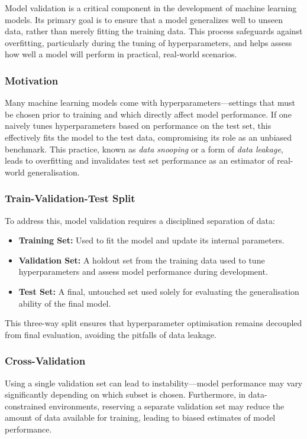 \documentclass[9pt]{extarticle}
\begin{document}
Model validation is a critical component in the development of machine learning models. Its primary goal is to ensure that a model generalizes well to unseen data, rather than merely fitting the training data. This process safeguards against overfitting, particularly during the tuning of hyperparameters, and helps assess how well a model will perform in practical, real-world scenarios.

\subsubsection*{Motivation}

Many machine learning models come with hyperparameters—settings that must be chosen prior to training and which directly affect model performance. If one naively tunes hyperparameters based on performance on the test set, this effectively fits the model to the test data, compromising its role as an unbiased benchmark. This practice, known as \textit{data snooping} or a form of \textit{data leakage}, leads to overfitting and invalidates test set performance as an estimator of real-world generalisation.

\subsubsection*{Train-Validation-Test Split}

To address this, model validation requires a disciplined separation of data:
\begin{itemize}
    \item \textbf{Training Set:} Used to fit the model and update its internal parameters.
    \item \textbf{Validation Set:} A holdout set from the training data used to tune hyperparameters and assess model performance during development.
    \item \textbf{Test Set:} A final, untouched set used solely for evaluating the generalisation ability of the final model.
\end{itemize}

This three-way split ensures that hyperparameter optimisation remains decoupled from final evaluation, avoiding the pitfalls of data leakage.

\subsubsection*{Cross-Validation}

Using a single validation set can lead to instability—model performance may vary significantly depending on which subset is chosen. Furthermore, in data-constrained environments, reserving a separate validation set may reduce the amount of data available for training, leading to biased estimates of model performance.
\end{document}
